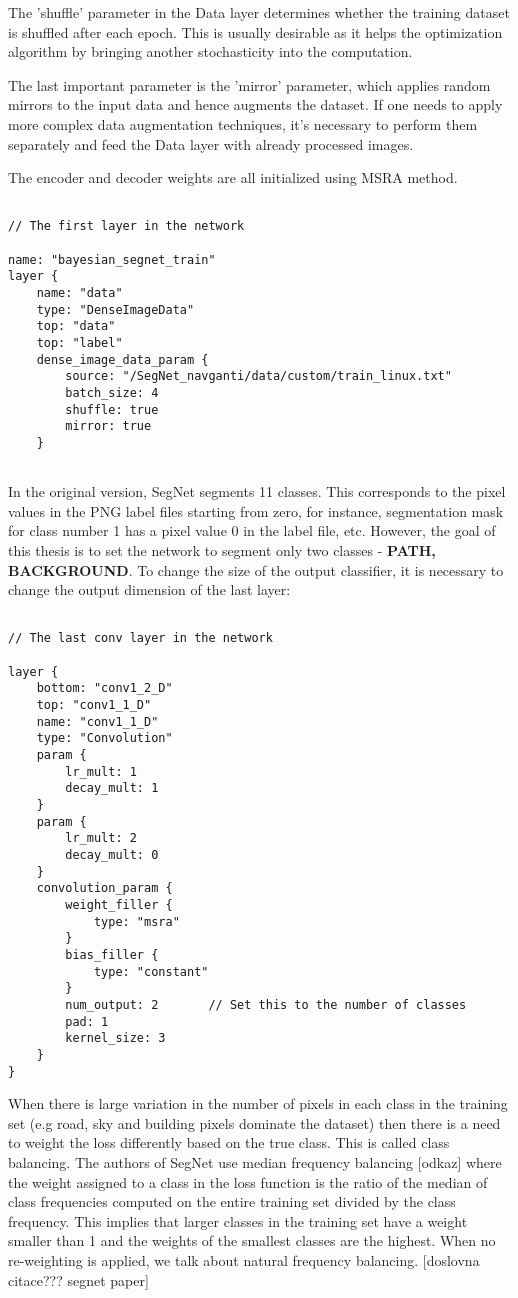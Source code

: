 The 'shuffle' parameter in the Data layer determines whether the training dataset is shuffled after each epoch. This is usually desirable as it helps the optimization algorithm by bringing another stochasticity into the computation. 

The last important parameter is the 'mirror' parameter, which applies random mirrors to the input data and hence augments the dataset. If one needs to apply more complex data augmentation techniques, it's necessary to perform them separately and feed the Data layer with already processed images.

The encoder and decoder weights are all initialized using MSRA method.  

\begin{lstlisting}

// The first layer in the network

name: "bayesian_segnet_train"
layer {
	name: "data"
	type: "DenseImageData"
	top: "data"
	top: "label"
	dense_image_data_param {
		source: "/SegNet_navganti/data/custom/train_linux.txt"
		batch_size: 4   			    			
		shuffle: true
		mirror: true	
	}
	
\end{lstlisting}	 

In the original version, SegNet segments 11 classes. This corresponds to the pixel values in the PNG label files starting from zero, for instance, segmentation mask for class number 1 has a pixel value 0 in the label file, etc. However, the goal of this thesis is to set the network to segment only two classes - \textbf{PATH, BACKGROUND}. To change the size of the output classifier, it is necessary to change the output dimension of the last layer:

\begin{lstlisting}

// The last conv layer in the network

layer {
	bottom: "conv1_2_D"
	top: "conv1_1_D"
	name: "conv1_1_D"
	type: "Convolution"
	param {
		lr_mult: 1
		decay_mult: 1
	}
	param {
		lr_mult: 2
		decay_mult: 0
	}
	convolution_param {
		weight_filler {
			type: "msra"
		}
		bias_filler {
			type: "constant"
		}
		num_output: 2		// Set this to the number of classes
		pad: 1
		kernel_size: 3
	}
}

\end{lstlisting}

When there is large variation in the number of
pixels in each class in the training set (e.g road, sky and building
pixels dominate the dataset) then there is a need to weight
the loss differently based on the true class. This is called class
balancing. The authors of SegNet use median frequency balancing [odkaz] where the weight assigned to a class in the loss function is the ratio of the
median of class frequencies computed on the entire training set
divided by the class frequency. This implies that larger classes in
the training set have a weight smaller than 1 and the weights
of the smallest classes are the highest. When no re-weighting is applied, we talk about natural frequency balancing. [doslovna citace??? segnet paper]

